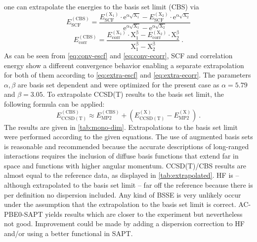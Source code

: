 \documentclass[a4paper,12pt, parskip=half]{scrartcl}
\begin{document}
%
one can extrapolate the energies to the basis set limit (CBS) via
%
\begin{equation}
	E_\mathrm{SCF}^{(\mathrm{CBS})} = \frac{E_\mathrm{SCF}^{(\mathrm{X_1})} \cdot \mathrm{e^{\alpha\sqrt{X_1}}} - E_\mathrm{SCF}^{(\mathrm{X_2})} \cdot \mathrm{e^{\alpha\sqrt{X_2}}}}{\mathrm{e^{\alpha\sqrt{X_1}}} - \mathrm{e^{\alpha\sqrt{X_2}}}}
	\label{eq:extra-escf}
\end{equation}
%
\begin{equation}
	E_\mathrm{corr}^{(\mathrm{CBS})} = \frac{E_\mathrm{corr}^{(\mathrm{X_1})} \cdot \mathrm{X^{\beta}_1} - E_\mathrm{corr}^{(\mathrm{X_2})} \cdot \mathrm{X^{\beta}_2}}{\mathrm{X^{\beta}_1} - \mathrm{X^{\beta}_2}}~.
	\label{eq:extra-ecorr}
\end{equation}
%
As can be seen from \autoref{eq:conv-escf} and \autoref{eq:conv-ecorr}, SCF and correlation energy show a different convergence behavior enabling a separate extrapolation for both of them according to \autoref{eq:extra-escf} and \autoref{eq:extra-ecorr}. The parameters $ \alpha,\beta $ are basis set dependent and were optimized for the present case as $ \alpha = 5.79 $ and $ \beta = 3.05 $. To extrapolate CCSD(T) results to the basis set limit, the following formula can be applied:
%
\begin{equation}
	E_\mathrm{CCSD(T)}^\mathrm{(CBS)} \approx E_\mathrm{MP2}^\mathrm{(CBS)} + ( E_\mathrm{CCSD(T)}^\mathrm{(X)} - E_\mathrm{MP2}^\mathrm{(X)})~.
\end{equation}
%
The results are given in \autoref{tab:mono-dim}. Extrapolations to the basis set limit were performed according to the given equations. The use of augmented basis sets is reasonable and recommended because the accurate descriptions of long-ranged interactions requires the inclusion of diffuse basis functions that extend far in space and functions with higher angular momentum. CCSD(T)/CBS results are almost equal to the reference data, as displayed in \autoref{tab:extrapolated}. HF is -- although extrapolated to the basis set limit -- far off the reference because there is per definition no dispersion included. Any kind of BSSE is very unlikely occur under the assumption that the extrapolation to the basis set limit is correct. AC-PBE0-SAPT yields results which are closer to the experiment but nevertheless not good. Improvement could be made by adding a dispersion correction to HF and/or using a better functional in SAPT.
\end{document}
